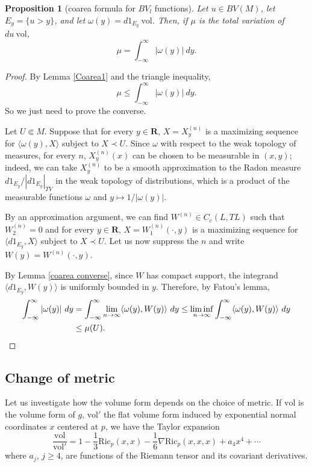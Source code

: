 \documentclass[reqno,12pt,letterpaper]{amsart}
\newcommand{\RR}{\mathbf{R}}
\newcommand{\Ric}{\mathrm{Ric}}
\newcommand{\vol}{\mathrm{vol}}
\newtheorem{proposition}[theorem]{Proposition}
\theoremstyle{definition}
\numberwithin{equation}{section}
\begin{document}
\begin{proposition}[coarea formula for $BV_l$ functions]\label{Coarea2}
Let $u \in BV(M)$, let $E_y = \{u > y\}$, and let $\omega(y) = d1_{E_y} ~\vol$.
Then, if $\mu$ is the total variation of $du ~\vol$,
$$\mu = \int_{-\infty}^\infty |\omega(y)| ~dy.$$
\end{proposition}
\begin{proof}
By Lemma \ref{Coarea1} and the triangle inequality,
$$\mu \leq \int_{-\infty}^\infty |\omega(y)| ~dy.$$
So we just need to prove the converse.

Let $U \Subset M$.
Suppose that for every $y \in \RR$, $X = X^{(n)}_y$ is a maximizing sequence for $\langle \omega(y), X\rangle$ subject to $X \prec U$.
Since $\omega$ with respect to the weak topology of measures, for every $n$, $X^{(n)}_y(x)$ can be chosen to be measurable in $(x, y)$; indeed, we can take $X^{(n)}_y$ to be a smooth approximation to the Radon measure $d 1_{E_y}/|d 1_{E_y}|_{TV}$ in the weak topology of distributions, which is a product of the measurable functions $\omega$ and $y \mapsto 1/|\omega(y)|$.

By an approximation argument, we can find $W^{(n)} \in C_c(L, TL)$ such that $W^{(n)}_2 = 0$ and for every $y \in \RR$, $X = W^{(n)}_1(\cdot, y)$ is a maximizing sequence for $\langle d 1_{E_y}, X\rangle$ subject to $X \prec U$.
Let us now suppress the $n$ and write $W(y) = W^{(n)}(\cdot, y)$.

By Lemma \ref{coarea converse}, since $W$ has compact support, the integrand $\langle d 1_{E_y}, W(y)\rangle$ is uniformly bounded in $y$.
Therefore, by Fatou's lemma,
\begin{align*}
\int_{-\infty}^\infty |\omega(y)| ~dy &= \int_{-\infty}^\infty \lim_{n \to \infty} \langle \omega(y), W(y)\rangle ~dy \leq \liminf_{n \to \infty} \int_{-\infty}^\infty \langle \omega(y), W(y)\rangle ~dy \\
&\leq \mu(U). \qedhere
\end{align*}
\end{proof}


\subsection{Change of metric}\label{change of metric}
Let us investigate how the volume form depends on the choice of metric.
If $\vol$ is the volume form of $g$, $\vol'$ the flat volume form induced by exponential normal coordinates $x$ centered at $p$, we have
the Taylor expansion \cite[p59]{chow2006hamilton}
\begin{equation}\label{Taylor expansion of determinant}
\frac{\vol}{\vol'} = 1 - \frac{1}{3} \Ric_p(x, x) - \frac{1}{6} \nabla \Ric_p(x, x, x) + a_4x^4 + \cdots
\end{equation}
where $a_j$, $j \geq 4$, are functions of the Riemann tensor and its covariant derivatives.
\end{document}
